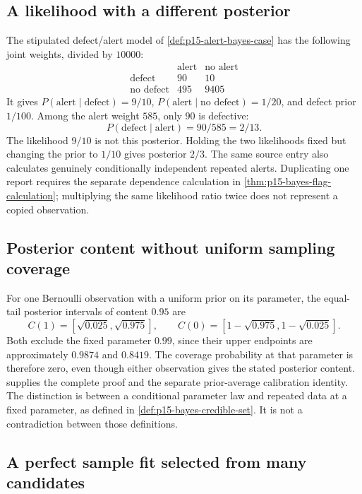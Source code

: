 \subsection{A likelihood with a different posterior}
\label{sec:p14-counter-base-rate}

The stipulated defect/alert model of \cref{def:p15-alert-bayes-case} has
the following joint weights, divided by \(10000\):
\[
\begin{array}{c|rr}
 &\text{alert}&\text{no alert}\\\hline
 \text{defect}&90&10\\
 \text{no defect}&495&9405
\end{array}
\]
It gives \(P(\text{alert}\mid\text{defect})=9/10\),
\(P(\text{alert}\mid\text{no defect})=1/20\), and defect prior
\(1/100\). Among the alert weight \(585\), only \(90\) is defective:
\[
 P(\text{defect}\mid\text{alert})=90/585=2/13.
\]
The likelihood \(9/10\) is not this posterior. Holding the two likelihoods
fixed but changing the prior to \(1/10\) gives posterior \(2/3\).
The same source entry also calculates genuinely conditionally independent
repeated alerts. Duplicating one report requires the separate dependence
calculation in \cref{thm:p15-bayes-flag-calculation}; multiplying the same
likelihood ratio twice does not represent a copied observation.

\subsection{Posterior content without uniform sampling coverage}
\label{sec:p14-counter-coverage}

For one Bernoulli observation with a uniform prior on its parameter, the
equal-tail posterior intervals of content \(0.95\) are
\[
 C(1)=[\sqrt{0.025},\sqrt{0.975}],\qquad
 C(0)=[1-\sqrt{0.975},1-\sqrt{0.025}].
\]
Both exclude the fixed parameter \(0.99\), since their upper endpoints
are approximately \(0.9874\) and \(0.8419\). The coverage probability
at that parameter is therefore zero, even though either observation gives
the stated posterior content.  supplies the
complete proof and the separate prior-average calibration identity.
The distinction is between a conditional parameter law and repeated data
at a fixed parameter, as defined in \cref{def:p15-bayes-credible-set}.
It is not a contradiction between those definitions.

\subsection{A perfect sample fit selected from many candidates}
\label{sec:p14-counter-selection}

